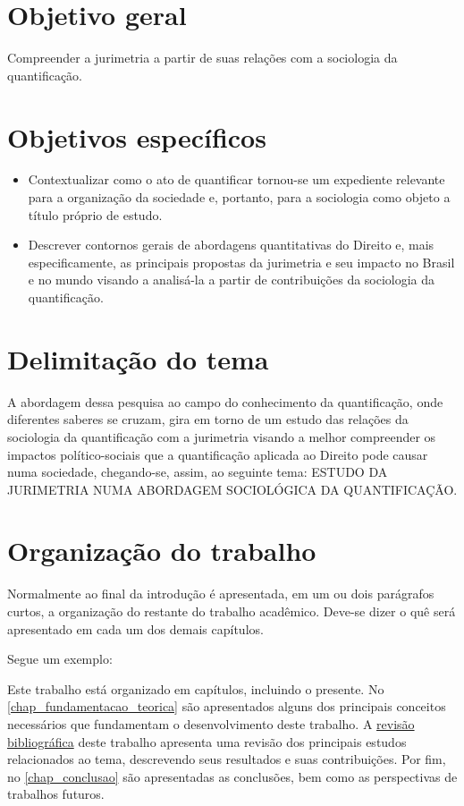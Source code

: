 \section{Objetivo geral}
Compreender a jurimetria a partir de suas relações com a sociologia da quantificação.

\section{Objetivos específicos}
\begin{itemize}
	\item Contextualizar como o ato de quantificar tornou-se um expediente relevante para a organização da sociedade e, portanto, para a sociologia como objeto a título próprio de estudo.
	\item Descrever contornos gerais de abordagens quantitativas do Direito e, mais especificamente, as principais propostas da jurimetria e seu impacto no Brasil e no mundo visando a analisá-la a partir de contribuições da sociologia da quantificação.
\end{itemize}

\section{Delimitação do tema}
\label{sec_contribuicoes}

A abordagem dessa pesquisa ao campo do conhecimento da quantificação, onde diferentes saberes se cruzam, gira em torno de um estudo das relações da sociologia da quantificação com a jurimetria visando a melhor compreender os impactos político-sociais que a quantificação aplicada ao Direito pode causar numa sociedade, chegando-se, assim, ao seguinte tema: ESTUDO DA JURIMETRIA NUMA ABORDAGEM SOCIOLÓGICA DA QUANTIFICAÇÃO.

\section{Organização do trabalho}
\label{sec_organizacao_trabalho}

Normalmente ao final da introdução é apresentada, em um ou dois parágrafos curtos, a organização do restante do trabalho acadêmico.
Deve-se dizer o quê será apresentado em cada um dos demais capítulos.

Segue um exemplo:

Este trabalho está organizado em capítulos, incluindo o presente.
No \autoref{chap_fundamentacao_teorica} são apresentados alguns dos principais conceitos necessários que fundamentam o desenvolvimento deste trabalho.
A \hyperref[chap_trabalhos_relacionados]{revisão bibliográfica} deste trabalho apresenta uma revisão dos principais estudos relacionados ao tema, descrevendo seus resultados e suas contribuições.
Por fim, no \autoref{chap_conclusao} são apresentadas as conclusões, bem como as perspectivas de trabalhos futuros.
